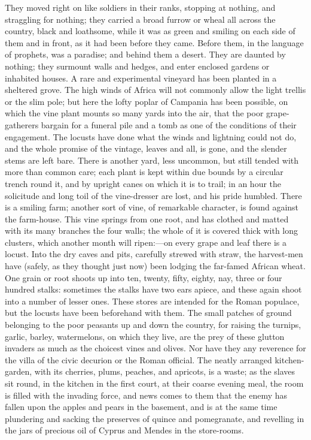 They moved right on like soldiers in their ranks, stopping at
nothing, and straggling for nothing; they carried a broad furrow
or wheal all across the country, black and loathsome, while it was as
green and smiling on each side of them and in front, as it had been
before they came. Before them, in the language of prophets, was a
paradise; and behind them a desert. They are daunted by nothing; they
surmount walls and hedges, and enter enclosed gardens or inhabited
houses. A rare and experimental vineyard has been planted in a
sheltered grove. The high winds of Africa will not commonly allow the
light trellis or the slim pole; but here the lofty poplar of Campania
has been possible, on which the vine plant mounts so many yards into
the air, that the poor grape-gatherers bargain for a funeral pile and
a tomb as one of the conditions of their engagement. The locusts have
done what the winds and lightning could not do, and the whole promise
of the vintage, leaves and all, is gone, and the slender stems are
left bare. There is another yard, less uncommon, but still tended with
more than common care; each plant is kept within due bounds by a
circular trench round it, and by upright canes on which it is to
trail; in an hour the solicitude and long toil of the vine-dresser are
lost, and his pride humbled. There is a smiling farm; another sort of
vine, of remarkable character, is found against the farm-house. This
vine springs from one root, and has clothed and matted with its many
branches the four walls; the whole of it is covered thick with long
clusters, which another month will ripen:—on every grape and
leaf there is a locust. Into the dry caves and pits, carefully strewed
with straw, the harvest-men have (safely, as they thought just now)
been lodging the far-famed African wheat. One grain or root shoots up
into ten, twenty, fifty, eighty, nay, three or four hundred stalks:
sometimes the stalks have two ears apiece, and these again shoot into
a number of lesser ones. These stores are intended for the Roman
populace, but the locusts have been beforehand with them. The small
patches of ground belonging to the poor peasants up and down the
country, for raising the turnips, garlic, barley, watermelons, on
which they live, are the prey of these glutton invaders as much as the
choicest vines and olives. Nor have they any reverence for the villa
of the civic decurion or the Roman official. The neatly arranged
kitchen-garden, with its cherries, plums, peaches, and apricots, is a
waste; as the slaves sit round, in the kitchen in the first court, at
their coarse evening meal, the room is filled with the invading force,
and news comes to them that the enemy has fallen upon the apples and
pears in the basement, and is at the same time plundering and sacking
the preserves of quince and pomegranate, and revelling in the jars of
precious oil of Cyprus and Mendes in the store-rooms.

